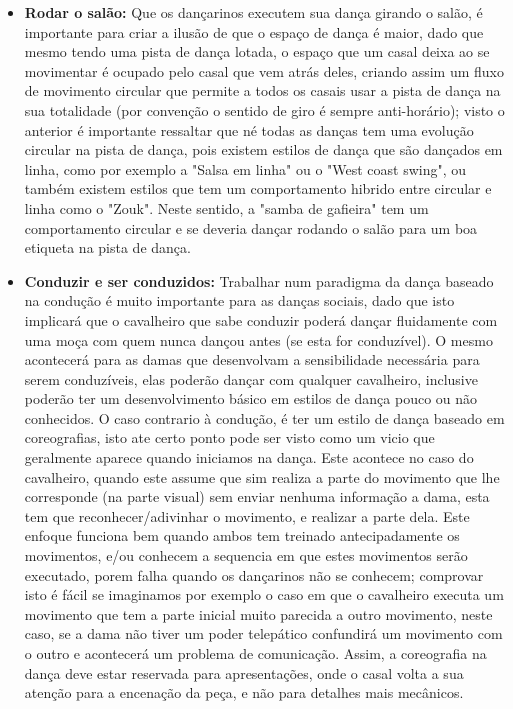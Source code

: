 \begin{itemize}
\item \textbf{Rodar o salão:} Que os dançarinos executem sua dança girando o salão, 
é importante para criar a ilusão de que o espaço de dança é maior, dado que mesmo
tendo uma pista de dança lotada, o espaço que um
casal deixa ao se movimentar é ocupado pelo casal que vem atrás deles, criando 
assim um fluxo de movimento circular que permite a todos os casais usar a pista de dança
na sua totalidade (por convenção o sentido de giro é sempre anti-horário); 
visto o anterior é importante ressaltar que né todas as danças tem
uma evolução circular na pista de dança, pois existem estilos de dança que são dançados em linha,
como por exemplo a "Salsa em linha" ou o "West coast swing", ou também existem estilos que
tem um comportamento hibrido entre circular e linha como o "Zouk". Neste sentido,
a "samba de gafieira"  tem um comportamento circular e se deveria dançar
rodando o salão para um boa etiqueta na pista de dança.
\item \textbf{Conduzir e ser conduzidos:} Trabalhar num paradigma da dança baseado
na condução é muito importante para as danças sociais, dado que isto implicará
que o cavalheiro  que sabe conduzir poderá dançar fluidamente com uma moça com quem nunca dançou
antes (se esta for conduzível). O mesmo acontecerá para as damas que desenvolvam
a sensibilidade necessária para serem conduzíveis, elas poderão dançar com qualquer
cavalheiro, inclusive poderão ter um desenvolvimento básico em estilos de dança pouco ou não conhecidos.
O caso contrario à condução, é ter um estilo de dança baseado em coreografias,
isto ate certo ponto pode ser visto como um vicio que geralmente aparece quando iniciamos
na dança. Este acontece no caso do cavalheiro, quando este assume que sim realiza a parte do movimento 
que lhe corresponde (na parte visual) sem enviar nenhuma informação a dama, 
esta tem que reconhecer/adivinhar o movimento, e realizar a parte dela. Este enfoque
funciona bem quando ambos tem treinado antecipadamente os movimentos, e/ou conhecem a sequencia
em que estes movimentos serão executado, porem falha quando os dançarinos não se conhecem;
comprovar isto é fácil se imaginamos por exemplo o caso em que o cavalheiro executa um movimento
que tem a parte inicial muito parecida a outro movimento, neste caso, se a dama não tiver
um poder telepático confundirá um movimento com o outro e acontecerá um problema de comunicação. Assim, a coreografia
na dança deve estar reservada para apresentações, onde o casal volta 
a sua atenção para a encenação da peça, e não para detalhes mais mecânicos.


\end{itemize}
